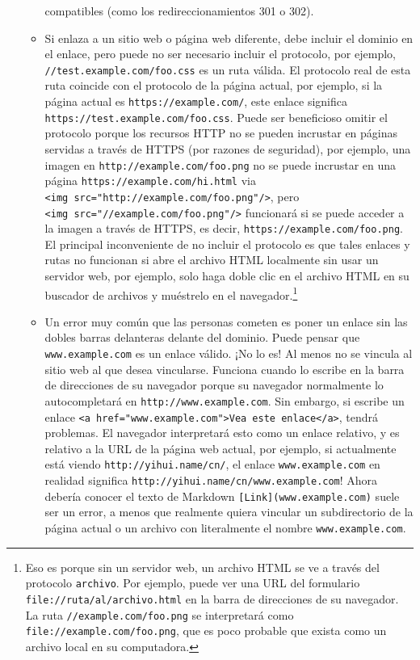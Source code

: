 \documentclass[12pt,]{krantz}
\theoremstyle{definition}
\theoremstyle{definition}
\theoremstyle{definition}
\theoremstyle{remark}
\begin{document}
\begin{itemize}
\begin{itemize}
    compatibles (como los redireccionamientos 301 o 302).
  \item
    Si enlaza a un sitio web o página web diferente, debe incluir el
    dominio en el enlace, pero puede no ser necesario incluir el
    protocolo, por ejemplo, \texttt{//test.example.com/foo.css} es un
    ruta válida. El protocolo real de esta ruta coincide con el
    protocolo de la página actual, por ejemplo, si la página actual es
    \texttt{https://example.com/}, este enlace significa
    \texttt{https://test.example.com/foo.css}. Puede ser beneficioso
    omitir el protocolo porque los recursos HTTP no se pueden incrustar
    en páginas servidas a través de HTTPS (por razones de seguridad),
    por ejemplo, una imagen en \texttt{http://example.com/foo.png} no se
    puede incrustar en una página \texttt{https://example.com/hi.html}
    via
    \texttt{\textless{}img\ src="http://example.com/foo.png"/\textgreater{}},
    pero
    \texttt{\textless{}img\ src="//example.com/foo.png"/\textgreater{}}
    funcionará si se puede acceder a la imagen a través de HTTPS, es
    decir, \texttt{https://example.com/foo.png}. El principal
    inconveniente de no incluir el protocolo es que tales enlaces y
    rutas no funcionan si abre el archivo HTML localmente sin usar un
    servidor web, por ejemplo, solo haga doble clic en el archivo HTML
    en su buscador de archivos y muéstrelo en el navegador.\footnote{Eso
      es porque sin un servidor web, un archivo HTML se ve a través del
      protocolo \texttt{archivo}. Por ejemplo, puede ver una URL del
      formulario \texttt{file://ruta/al/archivo.html} en la barra de
      direcciones de su navegador. La ruta
      \texttt{//example.com/foo.png} se interpretará como
      \texttt{file://example.com/foo.png}, que es poco probable que
      exista como un archivo local en su computadora.}
  \item
    Un error muy común que las personas cometen es poner un enlace sin
    las dobles barras delanteras delante del dominio. Puede pensar que
    \texttt{www.example.com} es un enlace válido. ¡No lo es! Al menos no
    se vincula al sitio web al que desea vincularse. Funciona cuando lo
    escribe en la barra de direcciones de su navegador porque su
    navegador normalmente lo autocompletará en
    \texttt{http://www.example.com}. Sin embargo, si escribe un enlace
    \texttt{\textless{}a\ href="www.example.com"\textgreater{}Vea\ este\ enlace\textless{}/a\textgreater{}},
    tendrá problemas. El navegador interpretará esto como un enlace
    relativo, y es relativo a la URL de la página web actual, por
    ejemplo, si actualmente está viendo \texttt{http://yihui.name/cn/},
    el enlace \texttt{www.example.com} en realidad significa
    \texttt{http://yihui.name/cn/www.example.com}! Ahora debería conocer
    el texto de Markdown \texttt{{[}Link{]}(www.example.com)} suele ser
    un error, a menos que realmente quiera vincular un subdirectorio de
    la página actual o un archivo con literalmente el nombre
    \texttt{www.example.com}.
  \end{itemize}
\end{itemize}
\end{document}
